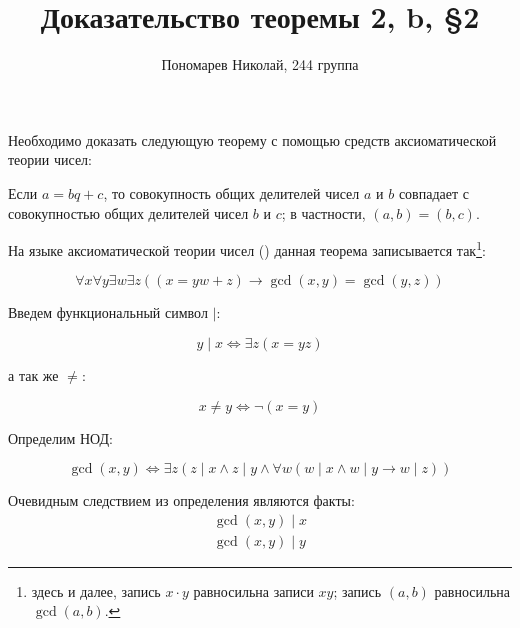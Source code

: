 \documentclass[12pt, a4paper, oneside]{memoir}
\title{Доказательство теоремы \textbf{2, b, \S 2}}
\author{Пономарев Николай, 244 группа}
\date{}
\begin{document}
\maketitle
Необходимо доказать следующую теорему с помощью средств аксиоматической теории чисел:
\begin{theorem*}
    Если $a = bq + c$, то совокупность общих делителей чисел $a$ и $b$ совпадает с совокупностью общих делителей чисел $b$ и $c$; в частности, $(a, b) = (b, c)$.
\end{theorem*}

На языке аксиоматической теории чисел (\FA) данная теорема записывается так\footnote{здесь и далее, запись $x \cdot y$ равносильна записи $xy$; запись $(a, b)$ равносильна $\gcd(a, b)$.}:
\begin{theorem*}
    \begin{equation}
        \forall x \forall y \exists w \exists z ((x = yw + z) \rightarrow \gcd(x, y) = \gcd(y, z)) \label{thm}
    \end{equation}
\end{theorem*}

Введем функциональный символ $\mid$:
\begin{definition}[делимость]
    \begin{equation}
        y \mid x \Leftrightarrow \exists z (x = yz)
    \end{equation}
\end{definition}
а так же $\neq$:
\begin{definition}[неравенство]
    \[x \neq y \Leftrightarrow \lnot (x = y)\]
\end{definition}

Определим НОД:
\begin{definition}[НОД]
    \begin{equation} \label{gcd}
        \gcd(x, y) \Leftrightarrow \exists z (z \mid x \land z \mid y \land \forall w (w \mid x \land w \mid y \rightarrow w \mid z))
    \end{equation}
\end{definition}
Очевидным следствием из определения являются факты:
\begin{gather}
    \gcd(x, y) \mid x \label{gcd:cor:1} \\
    \gcd(x, y) \mid y \label{gcd:cor:2}
\end{gather}
\end{document}
